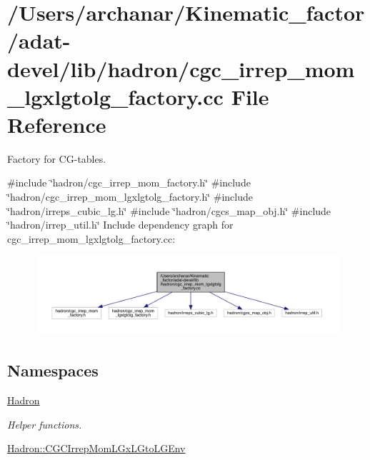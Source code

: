 \hypertarget{adat-devel_2lib_2hadron_2cgc__irrep__mom__lgxlgtolg__factory_8cc}{}\section{/\+Users/archanar/\+Kinematic\+\_\+factor/adat-\/devel/lib/hadron/cgc\+\_\+irrep\+\_\+mom\+\_\+lgxlgtolg\+\_\+factory.cc File Reference}
\label{adat-devel_2lib_2hadron_2cgc__irrep__mom__lgxlgtolg__factory_8cc}


Factory for C\+G-\/tables.  


{\ttfamily \#include \char`\"{}hadron/cgc\+\_\+irrep\+\_\+mom\+\_\+factory.\+h\char`\"{}}\newline
{\ttfamily \#include \char`\"{}hadron/cgc\+\_\+irrep\+\_\+mom\+\_\+lgxlgtolg\+\_\+factory.\+h\char`\"{}}\newline
{\ttfamily \#include \char`\"{}hadron/irreps\+\_\+cubic\+\_\+lg.\+h\char`\"{}}\newline
{\ttfamily \#include \char`\"{}hadron/cgcs\+\_\+map\+\_\+obj.\+h\char`\"{}}\newline
{\ttfamily \#include \char`\"{}hadron/irrep\+\_\+util.\+h\char`\"{}}\newline
Include dependency graph for cgc\+\_\+irrep\+\_\+mom\+\_\+lgxlgtolg\+\_\+factory.\+cc\+:
\nopagebreak
\begin{figure}[H]
\begin{center}
\leavevmode
\includegraphics[width=350pt]{d6/d78/adat-devel_2lib_2hadron_2cgc__irrep__mom__lgxlgtolg__factory_8cc__incl}
\end{center}
\end{figure}
\subsection*{Namespaces}
\begin{DoxyCompactItemize}
\item 
 \mbox{\hyperlink{namespaceHadron}{Hadron}}
\begin{DoxyCompactList}\small\item\em Helper functions. \end{DoxyCompactList}\item 
 \mbox{\hyperlink{namespaceHadron_1_1CGCIrrepMomLGxLGtoLGEnv}{Hadron\+::\+C\+G\+C\+Irrep\+Mom\+L\+Gx\+L\+Gto\+L\+G\+Env}}
\end{DoxyCompactItemize}
